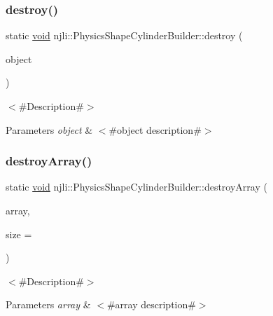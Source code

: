 \subsubsection{\texorpdfstring{destroy()}{destroy()}}
{\footnotesize\ttfamily static \mbox{\hyperlink{_thread_8h_af1e856da2e658414cb2456cb6f7ebc66}{void}} njli\+::\+Physics\+Shape\+Cylinder\+Builder\+::destroy (\begin{DoxyParamCaption}\item[{\mbox{\hyperlink{classnjli_1_1_physics_shape_cylinder_builder}{Physics\+Shape\+Cylinder\+Builder}} $\ast$}]{object }\end{DoxyParamCaption})\hspace{0.3cm}{\ttfamily [static]}}

$<$\#\+Description\#$>$


\begin{DoxyParams}{Parameters}
{\em object} & $<$\#object description\#$>$ \\
\hline
\end{DoxyParams}
\mbox{\label{classnjli_1_1_physics_shape_cylinder_builder_a105dd096a887c907388abd4033dea3bb}} 
\subsubsection{\texorpdfstring{destroy\+Array()}{destroyArray()}}
{\footnotesize\ttfamily static \mbox{\hyperlink{_thread_8h_af1e856da2e658414cb2456cb6f7ebc66}{void}} njli\+::\+Physics\+Shape\+Cylinder\+Builder\+::destroy\+Array (\begin{DoxyParamCaption}\item[{\mbox{\hyperlink{classnjli_1_1_physics_shape_cylinder_builder}{Physics\+Shape\+Cylinder\+Builder}} $\ast$$\ast$}]{array,  }\item[{const \mbox{\hyperlink{_util_8h_a10e94b422ef0c20dcdec20d31a1f5049}{u32}}}]{size = {} }\end{DoxyParamCaption})\hspace{0.3cm}{\ttfamily [static]}}

$<$\#\+Description\#$>$


\begin{DoxyParams}{Parameters}
{\em array} & $<$\#array description\#$>$ \\
\hline
\end{DoxyParams}
\mbox{\label{classnjli_1_1_physics_shape_cylinder_builder_ac345af0509040d7b42273277c77e9ae5}} 
